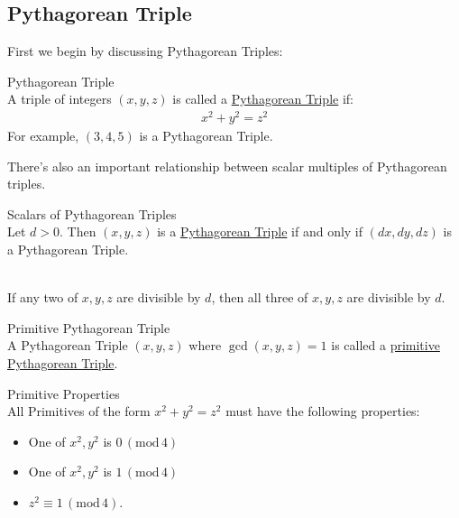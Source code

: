 \documentclass[10pt,oneside]{book}
\newcommand{\gspc}{\vspace{0.13cm}} %
\newcommand{\gline}{\gspc\\} %
\newcommand{\gmod}[1]{\,(\text{mod}\,#1)}
\newcommand{\ul}[1]{\underline{#1}}
\begin{document}
\newcommand{\cg}[1]{\color{OliveGreen}#1\color{white}}
\newcommand{\cb}[1]{\color{BlueViolet}#1\color{white}}

\subsection*{Pythagorean Triple}
First we begin by discussing Pythagorean Triples:
\begin{definition}{Pythagorean Triple}{}\gline
  A triple of integers $(x,y,z)$ is called a \ul{Pythagorean Triple} if:
  \begin{align*}
    x^2 + y^2 = z^2
  \end{align*}
  For example, $(3, 4, 5)$ is a Pythagorean Triple.
\end{definition}
There's also an important relationship between scalar multiples of Pythagorean triples.
\begin{theorem}{Scalars of Pythagorean Triples}{}\gline
  Let $d>0$. Then $(x,y,z)$ is a \ul{Pythagorean Triple} if and only if $(dx, dy, dz)$ is a Pythagorean Triple.
  \begin{corollary}{}{}\gline
  If any two of $x,y,z$ are divisible by $d$, then all three of $x,y,z$ are divisible by $d$.
\end{corollary}
\end{theorem}

\begin{definition}{Primitive Pythagorean Triple}{}\gline
  A Pythagorean Triple $(x,y,z)$ where $\gcd(x,y,z)=1$ is called a \ul{primitive Pythagorean Triple}.
  \begin{criterion}{Primitive Properties}{}\gline
      All Primitives of the form $x^2+y^2 = z^2$ must have the following properties:
      \begin{itemize}[itemsep=0pt, parsep=0pt]
        \item One of $x^2, y^2$ is $0\gmod{4}$
        \item One of $x^2,y^2$ is $1\gmod{4}$
        \item $z^2 \equiv 1\gmod 4$. 
      \end{itemize}
  \end{criterion}
\end{definition}
\end{document}
